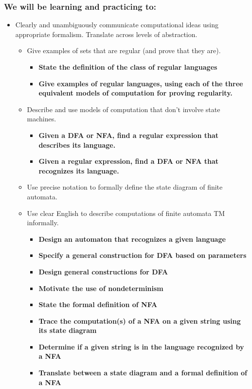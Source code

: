 \subsubsection*{We will be learning and practicing to:}
\begin{itemize}
\item Clearly and unambiguously communicate computational ideas using appropriate formalism. Translate across levels of abstraction.
\begin{itemize}
   \item Give examples of sets that are regular (and prove that they are).
   \begin{itemize}
      \item {\bf State the definition of the class of regular languages}
      \item {\bf Give examples of regular languages, using each of the three equivalent models of computation for proving regularity.}
   \end{itemize}
   \item Describe and use models of computation that don't involve state machines.
   \begin{itemize}
      \item {\bf Given a DFA or NFA, find a regular expression that describes its language.}
      \item {\bf Given a regular expression, find a DFA or NFA that recognizes its language.}
   \end{itemize}
   \item Use precise notation to formally define the state diagram of finite automata.
   \item Use clear English to describe computations of finite automata TM informally.
   \begin{itemize}
      \item {\bf Design an automaton that recognizes a given language}
      \item {\bf Specify a general construction for DFA based on parameters}
      \item {\bf Design general constructions for DFA}
      \item {\bf Motivate the use of nondeterminism}
      \item {\bf State the formal definition of NFA}   
      \item {\bf Trace the computation(s) of a NFA on a given string using its state diagram}
      \item {\bf Determine if a given string is in the language recognized by a NFA}
      \item {\bf Translate between a state diagram and a formal definition of a NFA}
   \end{itemize}
\end{itemize}


\end{itemize}
